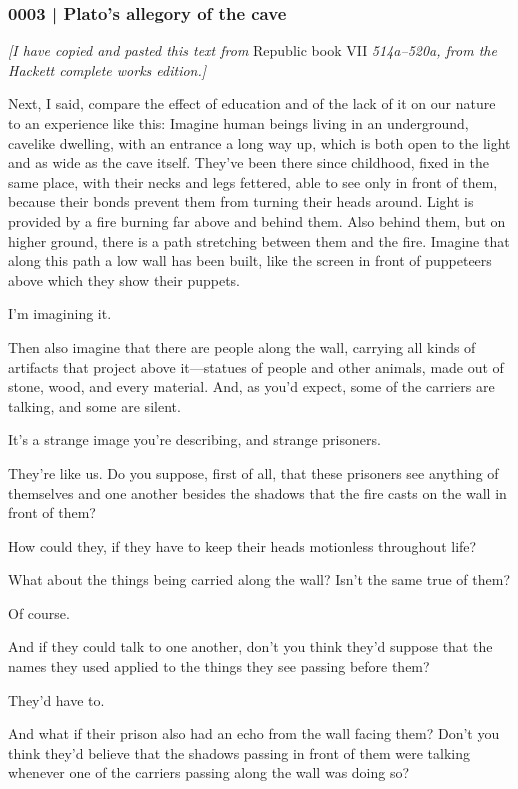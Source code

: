 		\subsubsection{0003 | Plato's allegory of the cave} %
			\label{GM-LIFE-SPIRITUALITY-0003}
			
			\textit{[I have copied and pasted this text from} Republic book VII \textit{514a--520a, from the Hackett complete works edition.]}
		
			Next, I said, compare the effect of education and of the lack of it on our nature to an experience like this: Imagine human beings living in an underground, cavelike dwelling, with an entrance a long way up, which is both open to the light and as wide as the cave itself. They've been there since childhood, fixed in the same place, with their necks and legs fettered, able to see only in front of them, because their bonds prevent them from turning their heads around. Light is provided by a fire burning far above and behind them. Also behind them, but on higher ground, there is a path stretching between them and the fire. Imagine that along this path a low wall has been built, like the screen in front of puppeteers above which they show their puppets. 

			I'm imagining it. 

			Then also imagine that there are people along the wall, carrying all kinds of artifacts that project above it---statues of people and other animals, made out of stone, wood, and every material. And, as you'd expect, some of the carriers are talking, and some are silent. 

			It's a strange image you're describing, and strange prisoners. 

			They're like us. Do you suppose, first of all, that these prisoners see anything of themselves and one another besides the shadows that the fire casts on the wall in front of them? 

			How could they, if they have to keep their heads motionless throughout life? 

			What about the things being carried along the wall? Isn't the same true of them? 

			Of course. 

			And if they could talk to one another, don't you think they'd suppose that the names they used applied to the things they see passing before them? 

			They'd have to. 

			And what if their prison also had an echo from the wall facing them? Don't you think they'd believe that the shadows passing in front of them were talking whenever one of the carriers passing along the wall was doing so? 


